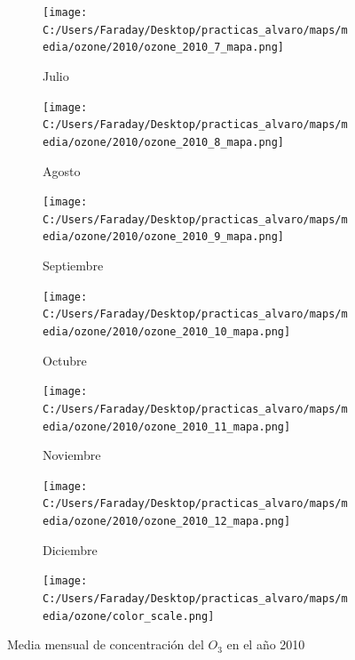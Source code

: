 \documentclass[12pt]{article}
\begin{document}
\begin{figure}[H]
\begin{subfigure}[H]{0.15\textwidth}
\texttt{[image: C:/Users/Faraday/Desktop/practicas\_alvaro/maps/media/ozone/2010/ozone\_2010\_7\_mapa.png]}
\captionsetup{labelformat=empty}
\caption{Julio}
\label{fig:map-ozone-2010-7}
\end{subfigure}
%
\begin{subfigure}[H]{0.15\textwidth}
\texttt{[image: C:/Users/Faraday/Desktop/practicas\_alvaro/maps/media/ozone/2010/ozone\_2010\_8\_mapa.png]}
\captionsetup{labelformat=empty}
\caption{Agosto}
\label{fig:map-ozone-2010-8}
\end{subfigure}
%
\begin{subfigure}[H]{0.15\textwidth}
\texttt{[image: C:/Users/Faraday/Desktop/practicas\_alvaro/maps/media/ozone/2010/ozone\_2010\_9\_mapa.png]}
\captionsetup{labelformat=empty}
\caption{Septiembre}
\label{fig:map-ozone-2010-9}
\end{subfigure}
%
\begin{subfigure}[H]{0.15\textwidth}
\texttt{[image: C:/Users/Faraday/Desktop/practicas\_alvaro/maps/media/ozone/2010/ozone\_2010\_10\_mapa.png]}
\captionsetup{labelformat=empty}
\caption{Octubre}
\label{fig:map-ozone-2010-10}
\end{subfigure}
%
\begin{subfigure}[H]{0.15\textwidth}
\texttt{[image: C:/Users/Faraday/Desktop/practicas\_alvaro/maps/media/ozone/2010/ozone\_2010\_11\_mapa.png]}
\captionsetup{labelformat=empty}
\caption{Noviembre}
\label{fig:map-ozone-2010-11}
\end{subfigure}
%
\begin{subfigure}[H]{0.15\textwidth}
\texttt{[image: C:/Users/Faraday/Desktop/practicas\_alvaro/maps/media/ozone/2010/ozone\_2010\_12\_mapa.png]}
\captionsetup{labelformat=empty}
\caption{Diciembre}
\label{fig:map-ozone-2010-12}
\end{subfigure}

\begin{subfigure}[H]{0.45\textwidth}
\texttt{[image: C:/Users/Faraday/Desktop/practicas\_alvaro/maps/media/ozone/color\_scale.png]}
\captionsetup{labelformat=empty}
\caption{}
\end{subfigure}

\vspace*{-7mm}
\caption{Media mensual de concentración del $O_{3}$ en el año 2010}
\label{fig:map-ozone-2010}
\end{figure}
\end{document}
